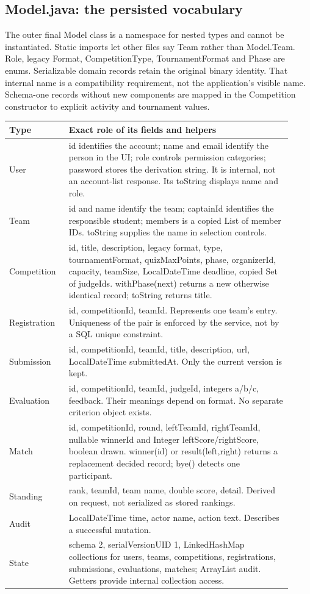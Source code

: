 \documentclass[12pt]{article}
\begin{document}
\subsection{Model.java: the persisted vocabulary}
The outer final Model class is a namespace for nested types and cannot be instantiated. Static imports let other files say Team rather than Model.Team. Role, legacy Format, CompetitionType, TournamentFormat and Phase are enums. Serializable domain records retain the original  binary identity. That internal name is a compatibility requirement, not the application's visible name. Schema-one records without new components are mapped in the Competition constructor to explicit activity and tournament values.

\begin{longtable}{p{0.19\linewidth}p{0.73\linewidth}}\toprule Type & Exact role of its fields and helpers\\\midrule\endhead
User & id identifies the account; name and email identify the person in the UI; role controls permission categories; password stores the derivation string. It is internal, not an account-list response. Its toString displays name and role.\\
Team & id and name identify the team; captainId identifies the responsible student; members is a copied List of member IDs. toString supplies the name in selection controls.\\
Competition & id, title, description, legacy format, type, tournamentFormat, quizMaxPoints, phase, organizerId, capacity, teamSize, LocalDateTime deadline, copied Set of judgeIds. withPhase(next) returns a new otherwise identical record; toString returns title.\\
Registration & id, competitionId, teamId. Represents one team's entry. Uniqueness of the pair is enforced by the service, not by a SQL unique constraint.\\
Submission & id, competitionId, teamId, title, description, url, LocalDateTime submittedAt. Only the current version is kept.\\
Evaluation & id, competitionId, teamId, judgeId, integers a/b/c, feedback. Their meanings depend on format. No separate criterion object exists.\\
Match & id, competitionId, round, leftTeamId, rightTeamId, nullable winnerId and Integer leftScore/rightScore, boolean drawn. winner(id) or result(left,right) returns a replacement decided record; bye() detects one participant.\\
Standing & rank, teamId, team name, double score, detail. Derived on request, not serialized as stored rankings.\\
Audit & LocalDateTime time, actor name, action text. Describes a successful mutation.\\
State & schema 2, serialVersionUID 1, LinkedHashMap collections for users, teams, competitions, registrations, submissions, evaluations, matches; ArrayList audit. Getters provide internal collection access.\\\bottomrule
\end{longtable}
\end{document}
